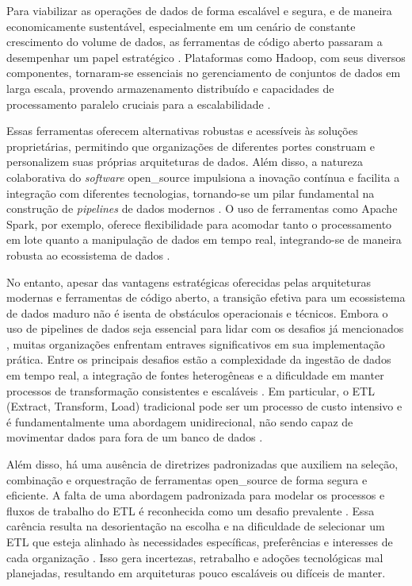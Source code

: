 Para viabilizar as operações de dados de forma escalável e segura, e de maneira economicamente sustentável, especialmente em um cenário de constante crescimento do volume de dados, as ferramentas de código aberto passaram a desempenhar um papel estratégico \cite[]{murarka2024, septian2019}. Plataformas como Hadoop, com seus diversos componentes, tornaram-se essenciais no gerenciamento de conjuntos de dados em larga escala, provendo armazenamento distribuído e capacidades de processamento paralelo cruciais para a escalabilidade \cite[]{murarka2024}.

Essas ferramentas oferecem alternativas robustas e acessíveis às soluções proprietárias, permitindo que organizações de diferentes portes construam e personalizem suas próprias arquiteturas de dados. Além disso, a natureza colaborativa do \textit{software} \acs{open_source} impulsiona a inovação contínua e facilita a integração com diferentes tecnologias, tornando-se um pilar fundamental na construção de \textit{pipelines} de dados modernos \cite[]{murarka2024, septian2019}. O uso de ferramentas como Apache Spark, por exemplo, oferece flexibilidade para acomodar tanto o processamento em lote quanto a manipulação de dados em tempo real, integrando-se de maneira robusta ao ecossistema de dados \cite[]{murarka2024}.
    
No entanto, apesar das vantagens estratégicas oferecidas pelas arquiteturas modernas e ferramentas de código aberto, a transição efetiva para um ecossistema de dados maduro não é isenta de obstáculos operacionais e técnicos. Embora o uso de pipelines de dados seja essencial para lidar com os desafios já mencionados \cite[]{murarka2024}, muitas organizações enfrentam entraves significativos em sua implementação prática. Entre os principais desafios estão a complexidade da ingestão de dados em tempo real, a integração de fontes heterogêneas e a dificuldade em manter processos de transformação consistentes e escaláveis \cite[]{murarka2024, nwokeji2021}. Em particular, o ETL (Extract, Transform, Load) tradicional pode ser um processo de custo intensivo e é fundamentalmente uma abordagem unidirecional, não sendo capaz de movimentar dados para fora de um banco de dados \cite[]{nwokeji2021, reverseetl2022}.

Além disso, há uma ausência de diretrizes padronizadas que auxiliem na seleção, combinação e orquestração de ferramentas \acs{open_source} de forma segura e eficiente. A falta de uma abordagem padronizada para modelar os processos e fluxos de trabalho do ETL é reconhecida como um desafio prevalente \cite[]{nwokeji2021}. Essa carência resulta na desorientação na escolha e na dificuldade de selecionar um ETL que esteja alinhado às necessidades específicas, preferências e interesses de cada organização \cite[]{boulahia2024}. Isso gera incertezas, retrabalho e adoções tecnológicas mal planejadas, resultando em arquiteturas pouco escaláveis ou difíceis de manter.

